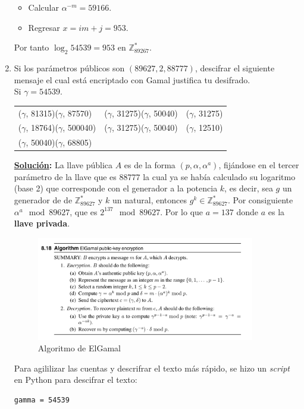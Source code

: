 \documentclass[11pt,letterpaper]{article}
\newcommand{\Z}{\mathbb{Z}}
\newcommand{\sol}{\textbf{\underline{Solución}: }} %
\begin{document}
\begin{enumerate}[label=\alph*)]
\begin{itemize}
\item Calcular $\alpha^{-m} = 59166$.
\item Regresar $x = im + j = 953$.
\end{itemize}

Por tanto $\log_2 54539 = 953$ en $\Z_{89267}^*$.


\item Si los parámetros públicos son $(89627, 2, 88777)$, descifrar el siguiente mensaje el cual
está encriptado con Gamal justifica tu desifrado.\\
Si $\gamma = 54539$.
\begin{table}[H]
\centering
\begin{tabular}{lll}
($\gamma$, 81315)($\gamma$, 87570)  & ($\gamma$, 31275)($\gamma$, 50040) & ($\gamma$, 31275) \\
($\gamma$, 18764)($\gamma$, 500040) & ($\gamma$, 31275)($\gamma$, 50040) & ($\gamma$, 12510) \\
($\gamma$, 50040)($\gamma$, 68805)  &                                    &                  
\end{tabular}
\end{table}

\sol La llave pública $A$ es de la forma $(p, \alpha, \alpha^a)$, fijándose en el tercer parámetro
de la llave que es $88777$ la cual ya se había calculado su logaritmo (base 2) que corresponde con el
generador a la potencia $k$, es decir, sea $g$ un generador de de $\Z_{89627}^*$ y $k$ un natural,
entonces $g^k \in \Z_{89627}^*$. Por consiguiente $\alpha^a \mod{89627}$, que es $2^{137} \mod 89627$.
Por lo que $a = 137$ donde $a$ es la \textbf{llave privada}.

\begin{figure}[H]
\caption{Algoritmo de ElGamal}
\centering
\includegraphics[width=0.9\textwidth]{assets/1f.png}
\end{figure}

Para agililizar las cuentas y descrifrar el texto más rápido, se hizo un \textit{script} en Python para
descifrar el texto:
\begin{verbatim}
gamma = 54539


\end{verbatim}
\end{enumerate}
\end{document}
